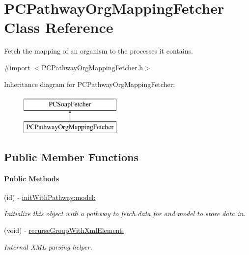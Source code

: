 \hypertarget{interface_p_c_pathway_org_mapping_fetcher}{
\section{PCPathwayOrgMappingFetcher Class Reference}
\label{interface_p_c_pathway_org_mapping_fetcher}
}


Fetch the mapping of an organism to the processes it contains.  




{\ttfamily \#import $<$PCPathwayOrgMappingFetcher.h$>$}

Inheritance diagram for PCPathwayOrgMappingFetcher:\begin{figure}[h!]
\begin{center}
\leavevmode
\includegraphics[height=2.000000cm]{kegg_doc/interface_p_c_pathway_org_mapping_fetcher}
\end{center}
\end{figure}
\subsection*{Public Member Functions}
\begin{Indent}\paragraph*{Public Methods}
\begin{DoxyCompactItemize}
\item 
\hypertarget{interface_p_c_pathway_org_mapping_fetcher_ab9c980d49d0586de6c6113b247e11b4d}{
(id) -\/ \hyperlink{interface_p_c_pathway_org_mapping_fetcher_ab9c980d49d0586de6c6113b247e11b4d}{initWithPathway:model:}}
\label{interface_p_c_pathway_org_mapping_fetcher_ab9c980d49d0586de6c6113b247e11b4d}

\begin{DoxyCompactList}\small\item\em Initialize this object with a pathway to fetch data for and model to store data in. \end{DoxyCompactList}\item 
\hypertarget{interface_p_c_pathway_org_mapping_fetcher_a8176ad4a9afe1fd520a5b4d7c5f886ba}{
(void) -\/ \hyperlink{interface_p_c_pathway_org_mapping_fetcher_a8176ad4a9afe1fd520a5b4d7c5f886ba}{recurseGroupWithXmlElement:}}
\label{interface_p_c_pathway_org_mapping_fetcher_a8176ad4a9afe1fd520a5b4d7c5f886ba}

\begin{DoxyCompactList}\small\item\em Internal XML parsing helper. \end{DoxyCompactList}\end{DoxyCompactItemize}
\end{Indent}
